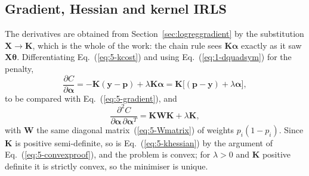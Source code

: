 \subsection{Gradient, Hessian and kernel IRLS}
\label{sec:kirls}

The derivatives are obtained from Section~\ref{sec:logreggradient} by the
substitution $\bm{X}\rightarrow\bm{K}$, which is the whole of the work: the
chain rule sees $\bm{K}\bm{\alpha}$ exactly as it saw $\bm{X}\bm{\theta}$.
Differentiating Eq.~(\ref{eq:5-kcost}) and using
Eq.~(\ref{eq:1-dquadsym}) for the penalty,
\begin{equation}
  \frac{\partial C}{\partial\bm{\alpha}}
   = -\bm{K}\left(\bm{y}-\bm{p}\right) + \lambda\bm{K}\bm{\alpha}
   = \bm{K}\Big[\left(\bm{p}-\bm{y}\right)+\lambda\bm{\alpha}\Big],
  \label{eq:5-kgradient}
\end{equation}
to be compared with Eq.~(\ref{eq:5-gradient}), and
\begin{equation}
  \frac{\partial^{2}C}
       {\partial\bm{\alpha}\,\partial\bm{\alpha}^{T}}
   = \bm{K}\bm{W}\bm{K} + \lambda\bm{K},
  \label{eq:5-khessian}
\end{equation}
with $\bm{W}$ the same diagonal matrix~(\ref{eq:5-Wmatrix}) of weights
$p_i(1-p_i)$.  Since $\bm{K}$ is positive semi-definite, so is
Eq.~(\ref{eq:5-khessian}) by the argument of Eq.~(\ref{eq:5-convexproof}), and
the problem is convex; for $\lambda>0$ and $\bm{K}$ positive definite it is
strictly convex, so the minimiser is unique.

